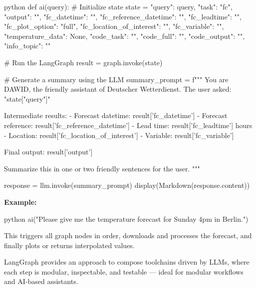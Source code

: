 \begin{codeonly}{python}
def ai(query):
    # Initialize state
    state = {
        "query": query,
        "task": "fc",
        "output": "",
        "fc_datetime": "",
        "fc_reference_datetime": "",
        "fc_leadtime": "",
        "fc_plot_option": "full",
        "fc_location_of_interest": "",
        "fc_variable": "",
        "temperature_data": None,
        "code_task": "",
        "code_full": "",
        "code_output": "",
        "info_topic": ""
    }

    # Run the LangGraph
    result = graph.invoke(state)

    # Generate a summary using the LLM
    summary_prompt = f"""
    You are DAWID, the friendly assistant of Deutscher Wetterdienst. The user asked: "{state["query"]}"

    Intermediate results:
    - Forecast datetime: {result['fc_datetime']}
    - Forecast reference: {result['fc_reference_datetime']}
    - Lead time: {result['fc_leadtime']} hours
    - Location: {result['fc_location_of_interest']}
    - Variable: {result['fc_variable']}

    Final output: {result['output']}

    Summarize this in one or two friendly sentences for the user.
    """

    response = llm.invoke(summary_prompt)
    display(Markdown(response.content))
\end{codeonly}

\textbf{Example:}

\begin{codeonly}{python}
	ai("Please give me the temperature forecast for Sunday 4pm in Berlin.")
\end{codeonly}

This triggers all graph nodes in order, downloads and processes the forecast, and finally plots or returns interpolated values.

\bigskip
LangGraph provides an approach to compose toolchains driven by LLMs, where each step is modular, inspectable, and testable — ideal for modular workflows and AI-based assistants.

